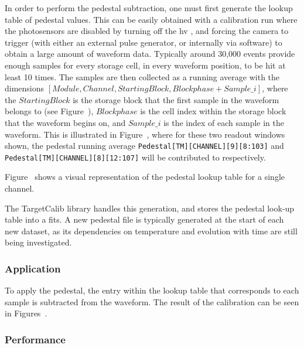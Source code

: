 In order to perform the pedestal subtraction, one must first generate the lookup table of pedestal values. This can be easily obtained with a calibration run where the photosensors are disabled by turning off the \gls{hv} , and forcing the camera to trigger (with either an external pulse generator, or internally via software) to obtain a large amount of waveform data. Typically around 30,000 events provide enough samples for every storage cell, in every waveform position, to be hit at least 10 times. The samples are then collected as a running average with the dimensions $[Module, Channel, Starting Block, Blockphase+Sample\_i]$, where the $Starting Block$ is the storage block that the first sample in the waveform belongs to (see Figure~), $Blockphase$ is the cell index within the storage block that the waveform begins on, and $Sample\_i$ is the index of each sample in the waveform. This is illustrated in Figure~, where for these two readout windows shown, the pedestal running average \lstinline{Pedestal[TM][CHANNEL][9][8:103]} and \lstinline{Pedestal[TM][CHANNEL][8][12:107]} will be contributed to respectively.

Figure~ shows a visual representation of the pedestal lookup table for a single channel. 

The TargetCalib library handles this generation, and stores the pedestal look-up table into a \gls{fits}. A new pedestal file is typically generated at the start of each new dataset, as its dependencies on temperature and evolution with time are still being investigated.

\subsubsection{Application}

To apply the pedestal, the entry within the lookup table that corresponds to each sample is subtracted from the waveform. The result of the calibration can be seen in Figures~. 

\subsubsection{Performance}

